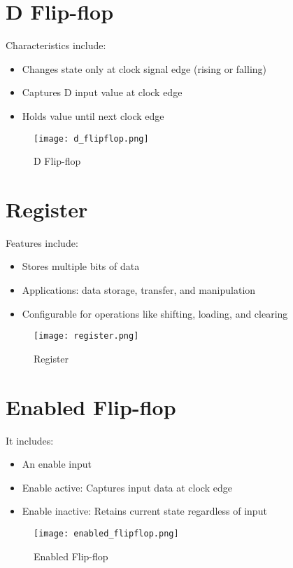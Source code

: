 \documentclass[12pt]{report}
\begin{document}
\section{D Flip-flop}
 Characteristics include:
\begin{itemize}
    \item Changes state only at clock signal edge (rising or falling)
    \item Captures D input value at clock edge
    \item Holds value until next clock edge
\end{itemize}
\begin{figure}[H]
    \centering
    \texttt{[image: d\_flipflop.png]}
    \caption{D Flip-flop}
\end{figure}

\section{Register}
 Features include:
\begin{itemize}
    \item Stores multiple bits of data
    \item Applications: data storage, transfer, and manipulation
    \item Configurable for operations like shifting, loading, and clearing
\end{itemize}
\begin{figure}[H]
    \centering
    \texttt{[image: register.png]}
    \caption{Register}
\end{figure}

\section{Enabled Flip-flop}
 It includes:
\begin{itemize}
    \item An enable input
    \item Enable active: Captures input data at clock edge
    \item Enable inactive: Retains current state regardless of input
\end{itemize}
\begin{figure}[H]
    \centering
    \texttt{[image: enabled\_flipflop.png]}
    \caption{Enabled Flip-flop}
\end{figure}
\end{document}
